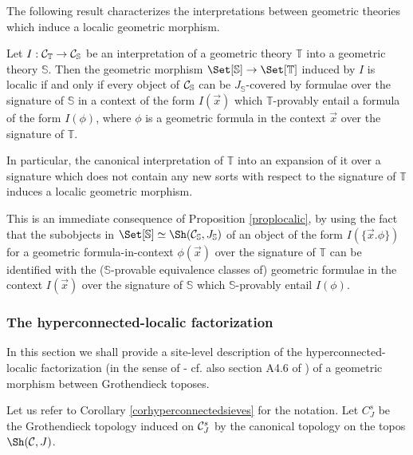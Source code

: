 \documentclass[a4paper,12pt]{article}
\begin{document}
The following result characterizes the interpretations between geometric theories which induce a localic geometric morphism.

\begin{proposition}
	Let $I:{\cal C}_{\mathbb T}\to {\cal C}_{\mathbb S}$ be an interpretation of a geometric theory $\mathbb T$ into a geometric theory ${\mathbb S}$. Then the geometric morphism $\Set[{\mathbb S}]\to \Set[{\mathbb T}]$ induced by $I$ is localic if and only if every object of ${\cal C}_{\mathbb S}$ can be $J_{\mathbb S}$-covered by formulae over the signature of $\mathbb S$ in a context of the form $I(\vec{x})$ which $\mathbb T$-provably entail a formula of the form $I(\phi)$, where $\phi$ is a geometric formula in the context $\vec{x}$ over the signature of $\mathbb T$. 
	
	In particular, the canonical interpretation of $\mathbb T$ into an expansion of it over a signature which does not contain any new sorts with respect to the signature of $\mathbb T$ induces a localic geometric morphism.  
\end{proposition}

\begin{proofs}
	This is an immediate consequence of Proposition \ref{proplocalic}, by using the fact that the subobjects in $\Set[{\mathbb S}]\simeq \Sh({\cal C}_{\mathbb S}, J_{\mathbb S})$ of an object of the form $I(\{\vec{x}. \phi\})$ for a geometric formula-in-context $\phi(\vec{x})$ over the signature of $\mathbb T$ can be identified with the ($\mathbb S$-provable equivalence classes of) geometric formulae in the context $I(\vec{x})$ over the signature of $\mathbb S$ which $\mathbb S$-provably entail $I(\phi)$.
\end{proofs}

\subsubsection{The hyperconnected-localic factorization}\label{sec:hyperconnfact}

In this section we shall provide a site-level description of the hyperconnected-localic factorization (in the sense of \cite{Johnstonefactorization} - cf. also section A4.6 of \cite{El}) of a geometric morphism between Grothendieck toposes.

Let us refer to Corollary \ref{corhyperconnectedsieves} for the notation. Let $C_{J}^{s}$ be the Grothendieck topology induced on ${\cal C}_{J}^{s}$ by the canonical topology on the topos $\Sh({\cal C}, J)$.
\end{document}
